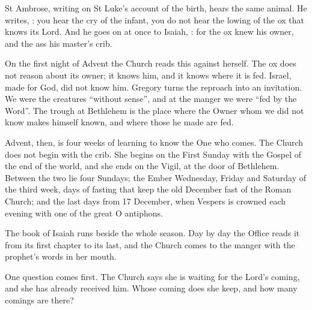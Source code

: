 St Ambrose, writing on St Luke's account of the birth, hears the same animal.
He writes, : you hear the cry of the infant, you do not hear the lowing of the ox
that knows its Lord. And he goes on at once to Isaiah, : for the ox knew his owner,
and the ass his master's crib.

On the first night of Advent the Church reads this against herself. The ox
does not reason about its owner; it knows him, and it knows where it is fed.
Israel, made for God, did not know him. Gregory turns the reproach into an
invitation. We were the creatures ``without sense'', and at the manger we were
``fed by the Word''. The trough at Bethlehem is the place where the Owner whom
we did not know makes himself known, and where those he made are fed.

Advent, then, is four weeks of learning to know the One who comes. The Church
does not begin with the crib. She begins on the First Sunday with the Gospel of
the end of the world, and she ends on the Vigil, at the door of Bethlehem.
Between the two lie four Sundays; the Ember Wednesday, Friday and Saturday of
the third week, days of fasting that keep the old December fast of the Roman
Church; and the last days from 17 December, when Vespers is crowned each
evening with one of the great O antiphons.

The book of Isaiah runs beside the whole season. Day by day the Office reads
it from its first chapter to its last, and the Church comes to the manger with
the prophet's words in her mouth.

One question comes first. The Church says she is waiting for the Lord's
coming, and she has already received him. Whose coming does she keep, and how
many comings are there?
